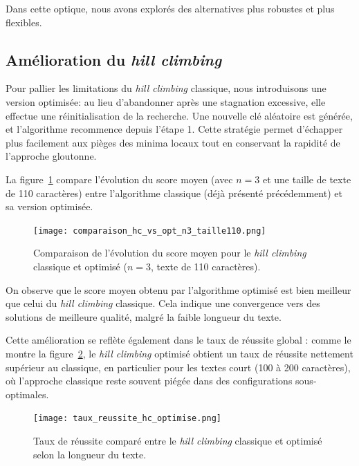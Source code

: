 \documentclass[a4paper]{article}
\begin{document}
Dans cette optique, nous avons explorés des alternatives plus robustes et plus flexibles.


\subsection{Amélioration du \textit{hill climbing}}

Pour pallier les limitations du \textit{hill climbing} classique, nous introduisons une version optimisée: au lieu d’abandonner après une
stagnation excessive, elle effectue une réinitialisation de la recherche. Une nouvelle clé aléatoire est
générée, et l’algorithme recommence depuis l’étape 1. Cette stratégie permet d’échapper plus facilement aux pièges des minima locaux tout en conservant la rapidité de l’approche gloutonne.

La figure~\ref{fig:hc_optimise_score} compare l’évolution du score moyen (avec $n=3$ et une taille de texte de 110 caractères) entre l’algorithme classique (déjà présenté précédemment) et sa version optimisée.

\begin{figure}[H]
    \centering
    \texttt{[image: comparaison\_hc\_vs\_opt\_n3\_taille110.png]}
    \caption{Comparaison de l’évolution du score moyen pour le \textit{hill climbing} classique et optimisé ($n=3$, texte de 110 caractères).}
    \label{fig:hc_optimise_score}
\end{figure}

On observe que le score moyen obtenu par l’algorithme optimisé est bien meilleur que celui du \textit{hill climbing} classique. Cela indique une convergence vers des solutions de meilleure qualité, malgré la faible longueur du texte.

Cette amélioration se reflète également dans le taux de réussite global : comme le montre la figure~\ref{fig:taux_reussite_hc_optimise}, le \textit{hill climbing} optimisé obtient un taux de réussite nettement supérieur au classique, en particulier pour les textes court (100 à 200 caractères), où l’approche classique reste souvent piégée dans des configurations sous-optimales.

\begin{figure}[H]
    \centering
    \texttt{[image: taux\_reussite\_hc\_optimise.png]}
    \caption{Taux de réussite comparé entre le \textit{hill climbing} classique et optimisé selon la longueur du texte.}
    \label{fig:taux_reussite_hc_optimise}
\end{figure}
\end{document}
